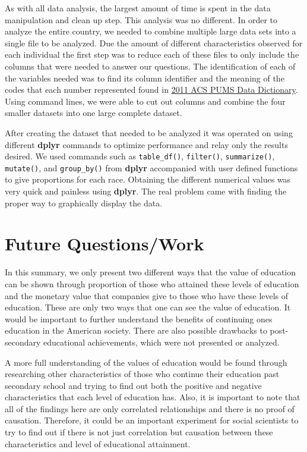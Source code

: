 \documentclass{article}
\begin{document}
As with all data analysis, the largest amount of time is spent in the data manipulation and clean up step. This 
analysis was no different. In order to analyze the entire country, we needed to combine multiple large data sets into a
single file to be analyzed. Due the amount of different characteristics observed for each individual the first step was to 
reduce each of these files to only include the columns that were needed to answer our questions. The identification of 
each of the variables needed was to find its column identifier and the meaning of the codes that each number represented
found in \underline{2011 ACS PUMS Data Dictionary}. Using command lines, we were able to cut out columns and combine 
the four smaller datasets into one large complete dataset. 

After creating the dataset that needed to be analyzed it was operated on using different \textbf{dplyr} commands to 
optimize performance and relay only the results desired. We used commands such as \texttt{table\_df()}, \texttt{filter()},
 \texttt{summarize()}, \texttt{mutate()}, and \texttt{group\_by()} from \textbf{dplyr} accompanied with user defined
  functions to give proportions for each race. Obtaining the different numerical values was very quick and painless using
  \textbf{dplyr}. The real problem came with finding the proper way to graphically display the data.

\section{Future Questions/Work}

In this summary, we only present two different ways that the value of education can be shown through proportion
of those who attained these levels of education and the monetary value that companies give to those who have these
levels of education. These are only two ways that one can see the value of education. It would be important to further
understand the benefits of continuing ones education in the American society. There are also possible drawbacks to 
post-secondary educational achievements, which were not presented or analyzed. 

A more full understanding of the values of education would be found through researching other characteristics of those
who continue their education past secondary school and trying to find out both the positive and negative characteristics
that each level of education has. Also, it is important to note that all of the findings here are only correlated relationships and 
there is no proof of causation. Therefore, it could be an important experiment for social scientists to try to find out if there
is not just correlation but causation between these characteristics and level of educational attainment. 
\end{document}
